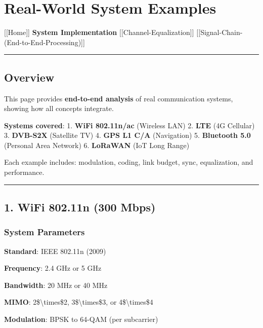 \section{Real-World System Examples}\label{real-world-system-examples}

{[}{[}Home{]}{]} \textbar{} \textbf{System Implementation} \textbar{}
{[}{[}Channel-Equalization{]}{]} \textbar{}
{[}{[}Signal-Chain-(End-to-End-Processing){]}{]}

\begin{center}\rule{0.5\linewidth}{0.5pt}\end{center}

\subsection{Overview}\label{overview}

This page provides \textbf{end-to-end analysis} of real communication
systems, showing how all concepts integrate.

\textbf{Systems covered}: 1. \textbf{WiFi 802.11n/ac} (Wireless LAN) 2.
\textbf{LTE} (4G Cellular) 3. \textbf{DVB-S2X} (Satellite TV) 4.
\textbf{GPS L1 C/A} (Navigation) 5. \textbf{Bluetooth 5.0} (Personal
Area Network) 6. \textbf{LoRaWAN} (IoT Long Range)

Each example includes: modulation, coding, link budget, sync,
equalization, and performance.

\begin{center}\rule{0.5\linewidth}{0.5pt}\end{center}

\subsection{1. WiFi 802.11n (300 Mbps)}\label{wifi-802.11n-300-mbps}

\subsubsection{System Parameters}\label{system-parameters}

\textbf{Standard}: IEEE 802.11n (2009)

\textbf{Frequency}: 2.4 GHz or 5 GHz

\textbf{Bandwidth}: 20 MHz or 40 MHz

\textbf{MIMO}: 2\$\textbackslash times\$2, 3\$\textbackslash times\$3,
or 4\$\textbackslash times\$4

\textbf{Modulation}: BPSK to 64-QAM (per subcarrier)

